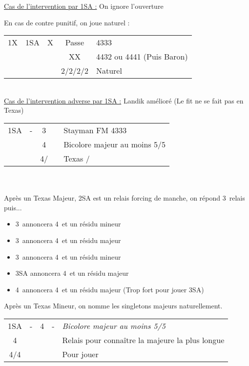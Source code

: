 \documentclass[a4paper, oneside, 11pt]{report}
\begin{document}
	\underline{Cas de l'intervention par 1SA :} On ignore l'ouverture
	
	En cas de contre punitif, on joue naturel :\\
	\begin{tabular}{cccc|l}
	1X & 1SA & X & Passe & 4333\\
	&&& XX & 4432 ou 4441 (Puis Baron)\\
	&&& 2\trefle/2\carreau/2\coeur/2\pique & Naturel\\
	\end{tabular}\\
	
	\underline{Cas de l'intervention adverse par 1SA :} Landik amélioré (Le fit ne se fait pas en Texas)\\

		\begin{tabular}{cccc|l}
		1SA & - & 3\carreau && Stayman FM 4333\\
		&& 4\trefle && Bicolore majeur au moins 5/5\\
		&& 4\carreau/\coeur && Texas \coeur/\pique\\
		\end{tabular}\\\\
	
		Après un Texas Majeur, 2SA est un relais forcing de manche, on répond 3\trefle\ relais puis...
		\begin{itemize}
		\item 3\carreau\ annoncera 4\trefle\ et un résidu mineur
		\item 3\coeur\ annoncera 4\trefle\ et un résidu majeur
		\item 3\pique\ annoncera 4\carreau\ et un résidu mineur
		\item 3SA annoncera 4\carreau\ et un résidu majeur
		\item 4\trefle\ annoncera 4\carreau\ et un résidu majeur (Trop fort pour jouer 3SA)\\
		\end{itemize}

		Après un Texas Mineur, on nomme les singletons majeurs naturellement.\\

		\begin{tabular}{cccc|l}
		1SA & - & 4\trefle & - & \it{Bicolore majeur au moins 5/5}\\
		4\carreau &&&& Relais pour connaître la majeure la plus longue\\
		4\coeur/4\pique &&&& Pour jouer\\
		\end{tabular}\\\\
\end{document}
